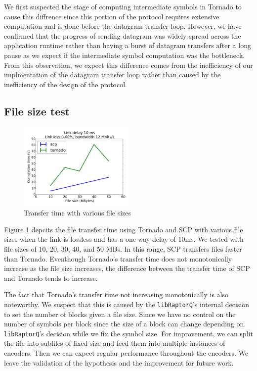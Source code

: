 \documentclass{sig-alternate-10pt}
\begin{document}
We first suspected the stage of computing intermediate symbols in Tornado to
cause this diffrence since this portion of the protocol requires extensive
computation and is done before the datagram transfer loop.  However, we have
confirmed that the progress of sending datagram was widely spread across the
application runtime rather than having a burst of datagram transfers after a
long pause as we expect if the intermediate symbol computation was the
bottleneck. From this observation, we expect this difference comes from the
inefficiency of our implmentation of the datagram transfer loop rather than
caused by the inefficiency of the design of the protocol.

\subsection{File size test}

\begin{figure}[t]
  \centering
  \includegraphics[width=0.5\textwidth]{filesize-plot}
  \caption{Transfer time with various file sizes}
  \label{f:filesize-plot}
\end{figure}

Figure \ref{f:filesize-plot} depcits the file transfer time using Tornado and
SCP with various file sizes when the link is lossless and has a one-way delay of
10ms. We tested with file sizes of 10, 20, 30, 40, and 50 MBs. In this range,
SCP transfers files faster than Tornado. Eventhough Tornado's transfer time does
not monotonically increase as the file size increases, the difference between
the transfer time of SCP and Tornado tends to increase.

The fact that Tornado's transfer time not increasing monotonically is also
noteworthy. We suspect that this is caused by the \texttt{libRaptorQ}'s internal
decision to set the number of blocks given a file size. Since we have no control
on the number of symbols per block since the size of a block can change
depending on \texttt{libRaptorQ}'s decision while we fix the symbol size. For
improvement, we can split the file into subfiles of fixed size and feed them
into multiple instances of encoders. Then we can expect regular performance
throughout the encoders. We leave the validation of the hypothesis and the
improvement for future work.
\end{document}
